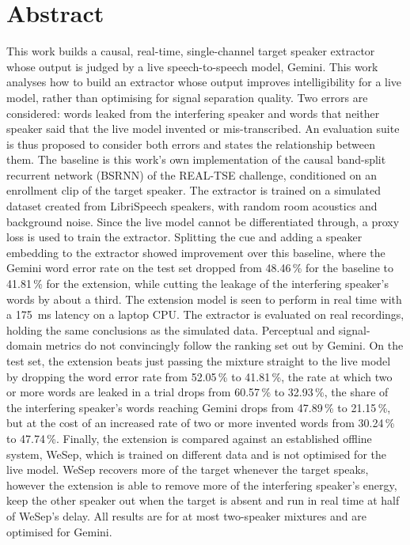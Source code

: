 \section*{Abstract}
This work builds a causal, real-time, single-channel target speaker extractor whose output is judged by a live speech-to-speech model, Gemini. This work analyses how to build an extractor whose output improves intelligibility for a live model, rather than optimising for signal separation quality. Two errors are considered: words leaked from the interfering speaker and words that neither speaker said that the live model invented or mis-transcribed. An evaluation suite is thus proposed to consider both errors and states the relationship between them. The baseline is this work's own implementation of the causal band-split recurrent network (BSRNN) of the REAL-TSE challenge, conditioned on an enrollment clip of the target speaker. The extractor is trained on a simulated dataset created from LibriSpeech speakers, with random room acoustics and background noise. Since the live model cannot be differentiated through, a proxy loss is used to train the extractor. Splitting the cue and adding a speaker embedding to the extractor showed improvement over this baseline, where the Gemini word error rate on the test set dropped from 48.46\,\% for the baseline to 41.81\,\% for the extension, while cutting the leakage of the interfering speaker's words by about a third. The extension model is seen to perform in real time with a \SI{175}{\milli\second} latency on a laptop CPU. The extractor is evaluated on real recordings, holding the same conclusions as the simulated data. Perceptual and signal-domain metrics do not convincingly follow the ranking set out by Gemini. On the test set, the extension beats just passing the mixture straight to the live model by dropping the word error rate from 52.05\,\% to 41.81\,\%, the rate at which two or more words are leaked in a trial drops from 60.57\,\% to 32.93\,\%, the share of the interfering speaker's words reaching Gemini drops from 47.89\,\% to 21.15\,\%, but at the cost of an increased rate of two or more invented words from 30.24\,\% to 47.74\,\%. Finally, the extension is compared against an established offline system, WeSep, which is trained on different data and is not optimised for the live model. WeSep recovers more of the target whenever the target speaks, however the extension is able to remove more of the interfering speaker's energy, keep the other speaker out when the target is absent and run in real time at half of WeSep's delay. All results are for at most two-speaker mixtures and are optimised for Gemini.